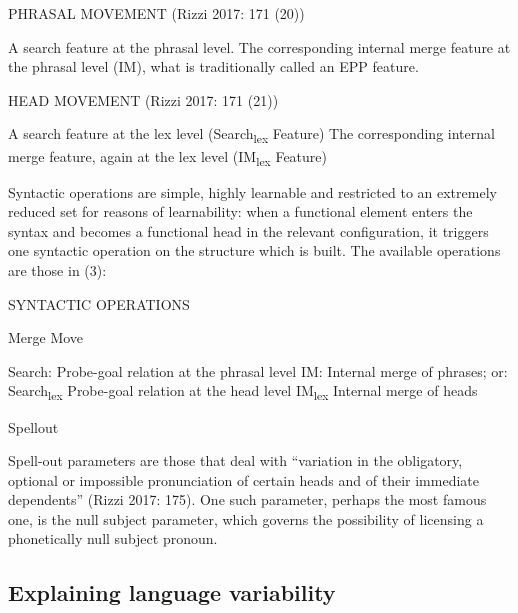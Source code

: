 \documentclass[fleqn,10pt]{wlscirep}
\begin{document}
\begin{exe}
    \ex PHRASAL MOVEMENT (Rizzi 2017: 171 (20))
        \begin{xlist}
            \ex A search feature at the phrasal level.
            \ex The corresponding internal merge feature at the phrasal level (IM), what is traditionally called an EPP feature.
        \end{xlist}
\end{exe}

\begin{exe}
    \ex HEAD MOVEMENT (Rizzi 2017: 171 (21)) 
        \begin{xlist}
            \ex A search feature at the lex level (Search\textsubscript{lex} Feature)
            \ex The corresponding internal merge feature, again at the lex level (IM\textsubscript{lex} Feature)
        \end{xlist}
\end{exe}

Syntactic operations are simple, highly learnable and restricted to an extremely reduced set for reasons of learnability: when a functional element enters the syntax and becomes a functional head in the relevant configuration, it triggers one syntactic operation on the structure which is built. The available operations are those in (3):
	
\begin{exe}
    \ex SYNTACTIC OPERATIONS
        \begin{xlist}
            \ex Merge
            \ex Move
                \begin{xlist}
                    \ex Search:	Probe-goal relation at the phrasal level
                    \ex IM:	Internal merge of phrases; or:
                    \ex Search\textsubscript{lex}	Probe-goal relation at the head level
                    \ex IM\textsubscript{lex}	Internal merge of heads
                \end{xlist}
            \ex Spellout
        \end{xlist}
    \end{exe}

Spell-out parameters are those that deal with “variation in the obligatory, optional or impossible pronunciation of certain heads and of their immediate dependents” (Rizzi 2017: 175). 
One such parameter, perhaps the most famous one, is the null subject parameter, which governs the possibility of licensing a phonetically null subject pronoun.

\subsection*{Explaining language variability}
\end{document}
